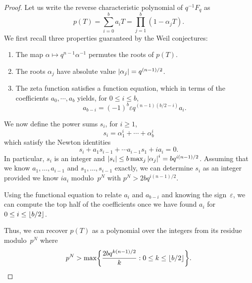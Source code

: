 \begin{proof}
Let us write the reverse characteristic polynomial of $q^{-1} F_q$ as 
\begin{equation*}
p(T) = \sum_{i=0}^{b} a_i T = \prod_{j=1}^{b} (1 - \alpha_j T).
\end{equation*}
We first recall three properties guaranteed by the Weil conjectures:
\begin{enumerate}
\item The map $\alpha \mapsto q^{n-1} \alpha^{-1}$ permutes the roots of $p(T)$.
\item The roots $\alpha_j$ have absolute value $\lvert\alpha_j\rvert = q^{(n-1)/2}$.
\item The zeta function satisfies a function equation, which in terms of 
      the coefficients $a_0, \dotsb, a_b$ yields, for $0 \leq i \leq b$, 
      \begin{equation*}
      a_{b-i} = (-1)^b \varepsilon q^{(n-1) (b/2 - i)} a_i.
      \end{equation*}
\end{enumerate}

We now define the power sums $s_i$, for $i \geq 1$, 
\begin{equation*}
s_i = \alpha_{1}^i + \dotsb + \alpha_{b}^i
\end{equation*}
which satisfy the Newton identities 
\begin{equation*}
s_i + a_1 s_{i-1} + \dotsb a_{i-1} s_1 + i a_i = 0.
\end{equation*}
In particular, $s_i$ is an integer and 
$\lvert s_i\rvert \leq b \max_j{\lvert\alpha_j\rvert}^i = b q^{i(n-1)/2}$.
Assuming that we know $a_1, \dotsc, a_{i-1}$ and $s_1, \dotsc, s_{i-1}$ 
exactly, we can determine $s_i$ as an integer provided we know 
$i a_i$ modulo~$p^N$ with \mbox{$p^N > 2 b q^{i(n-1)/2}$}.

Using the functional equation to relate $a_{i}$ and $a_{b-i}$ 
and knowing the sign~$\varepsilon$, we can compute the top half 
of the coefficients once we have found $a_i$ for 
$0 \leq i \leq \lfloor b/2\rfloor$.

Thus, we can recover $p(T)$ as a polynomial over the integers 
from its residue modulo~$p^N$ where 
\begin{equation*}
p^N > \max \biggl\{ \frac{2b q^{k(n-1)/2}}{k} : 0 \leq k \leq \lfloor b/2\rfloor \biggr\}.
\end{equation*}


\end{proof}
